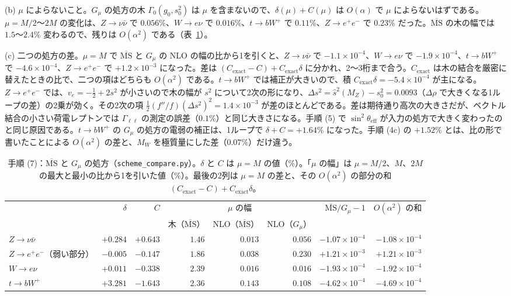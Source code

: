 \documentclass[a4paper,10pt]{ltjsarticle}
\newcommand{\MSbar}{\overline{\mathrm{MS}}}
\begin{document}
(b) $\mu$ によらないこと。$G_\mu$ の処方の木 $\Gamma_0(g_0,s_0^2)$ は $\mu$ を含まないので、$\delta(\mu)+C(\mu)$ は $O(\alpha)$ で $\mu$ によらないはずである。$\mu=M/2$〜$2M$ の変化は、$Z\to\nu\bar\nu$ で $0.056\%$、$W\to e\nu$ で $0.016\%$、$t\to bW^+$ で $0.11\%$、$Z\to e^+e^-$ で $0.23\%$ だった。$\MSbar$ の木の幅では $1.5$〜$2.4\%$ 変わるので、残りは $O(\alpha^2)$ である（表~\ref{tab:scheme}）。

(c) 二つの処方の差。$\mu=M$ で $\MSbar$ と $G_\mu$ の NLO の幅の比から1を引くと、$Z\to\nu\bar\nu$ で $-1.1\times10^{-4}$、$W\to e\nu$ で $-1.9\times10^{-4}$、$t\to bW^+$ で $-4.6\times10^{-4}$、$Z\to e^+e^-$ で $+1.2\times10^{-3}$ になった。差は $(C_{\mathrm{exact}}-C)+C_{\mathrm{exact}}\delta$ に分かれ、2〜3桁まで合う。$C_{\mathrm{exact}}$ は木の結合を厳密に替えたときの比で、二つの項はどちらも $O(\alpha^2)$ である。$t\to bW^+$ では補正が大きいので、積 $C_{\mathrm{exact}}\delta=-5.4\times10^{-4}$ が主になる。$Z\to e^+e^-$ では、$v_e=-\frac12+2s^2$ が小さいので木の幅が $s^2$ について2次の形になり、$\Delta s^2=\hat s^2(M_Z)-s_0^2=0.0093$（$\Delta\rho$ で大きくなる1ループの差）の2乗が効く。その2次の項 $\frac12(f''/f)(\Delta s^2)^2=1.4\times10^{-3}$ が差のほとんどである。差は期待通り高次の大きさだが、ベクトル結合の小さい荷電レプトンでは $\Gamma_{\ell\ell}$ の測定の誤差（$0.1\%$）と同じ大きさになる。手順 (5) で $\sin^2\theta_{\mathrm{eff}}$ が入力の処方で大きく変わったのと同じ原因である。$t\to bW^+$ の $G_\mu$ の処方の電弱の補正は、1ループで $\delta+C=+1.64\%$ になった。手順 (4c) の $+1.52\%$ とは、比の形で書いたことによる $O(\alpha^2)$ の差と、$M_W$ を極質量にした差（$0.07\%$）だけ違う。

\begin{table}[tbp]
\centering\small
\caption{手順 (7)：$\MSbar$ と $G_\mu$ の処方（\texttt{scheme\_compare.py}）。$\delta$ と $C$ は $\mu=M$ の値（$\%$）。「$\mu$ の幅」は $\mu=M/2$、$M$、$2M$ の最大と最小の比から1を引いた値（$\%$）。最後の2列は $\mu=M$ の差と、その $O(\alpha^2)$ の部分の和 $(C_{\mathrm{exact}}-C)+C_{\mathrm{exact}}\delta$。}
\label{tab:scheme}
\begin{tabular}{lrrrrrrr}
\toprule
 & $\delta$ & $C$ & \multicolumn{3}{c}{$\mu$ の幅} & $\MSbar/G_\mu-1$ & $O(\alpha^2)$ の和 \\
 & & & 木（$\MSbar$） & NLO（$\MSbar$） & NLO（$G_\mu$） & & \\
\midrule
$Z\to\nu\bar\nu$ & $+0.284$ & $+0.643$ & $1.46$ & $0.013$ & $0.056$ & $-1.07\times10^{-4}$ & $-1.08\times10^{-4}$ \\
$Z\to e^+e^-$（弱い部分） & $-0.005$ & $-0.147$ & $1.86$ & $0.038$ & $0.230$ & $+1.21\times10^{-3}$ & $+1.21\times10^{-3}$ \\
$W\to e\nu$ & $+0.011$ & $-0.338$ & $2.39$ & $0.016$ & $0.016$ & $-1.93\times10^{-4}$ & $-1.92\times10^{-4}$ \\
$t\to bW^+$ & $+3.281$ & $-1.643$ & $2.36$ & $0.143$ & $0.108$ & $-4.62\times10^{-4}$ & $-4.69\times10^{-4}$ \\
\bottomrule
\end{tabular}
\end{table}
\end{document}
